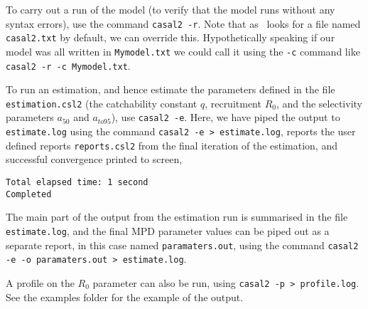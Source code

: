 To carry out a run of the model (to verify that the model runs without any syntax errors), use the command \texttt{casal2 -r}. Note that as \CNAME\ looks for a file named \texttt{casal2.txt} by default, we can override this. Hypothetically speaking if our model was all written in \texttt{Mymodel.txt} we could call it using the \texttt{-c} command like \texttt{casal2 -r -c Mymodel.txt}.

To run an estimation, and hence estimate the parameters defined in the file \texttt{estimation.csl2} (the catchability constant $q$, recruitment $R_0$, and the selectivity parameters $a_{50}$ and $a_{to95}$), use  \texttt{casal2 -e}. Here, we have piped the output to \texttt{estimate.log} using the command \texttt{casal2 -e > estimate.log}, reports the user defined reports \texttt{reports.csl2} from the final iteration of the estimation, and successful convergence printed to screen,
{\small{\begin{verbatim}
Total elapsed time: 1 second
Completed
\end{verbatim}}}

The main part of the output from the estimation run is summarised in the file \texttt{estimate.log}, and the final MPD parameter values can be piped out as a separate report, in this case named \texttt{paramaters.out}, using the command \texttt{casal2 -e -o paramaters.out > estimate.log}.

A profile on the $R_0$ parameter can also be run, using \texttt{casal2 -p > profile.log}. See the examples folder for the example of the output.

